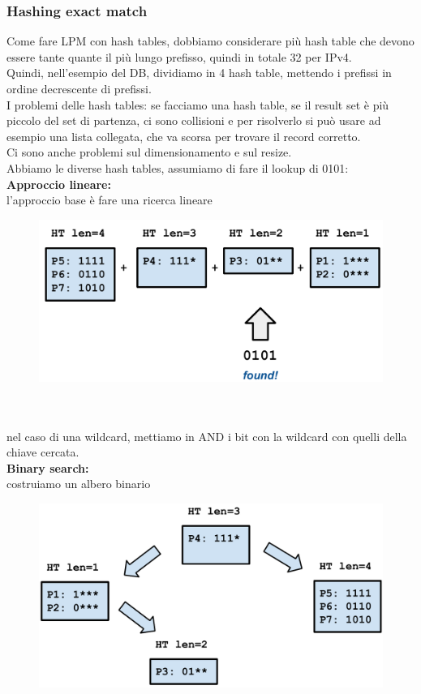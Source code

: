 \documentclass[12pt, oneside]{extbook} %
\begin{document}
\subsubsection{Hashing exact match}
Come fare LPM con hash tables, dobbiamo considerare più hash table che devono essere tante quante il più lungo prefisso, quindi in totale 32 per IPv4.
\\Quindi, nell'esempio del DB, dividiamo in 4 hash table, mettendo i prefissi in ordine decrescente di prefissi.
\\I problemi delle hash tables: se facciamo una hash table, se il result set è più piccolo del set di partenza, ci sono collisioni e per risolverlo si può usare ad esempio una lista collegata, che va scorsa per trovare il record corretto.
\\Ci sono anche problemi sul dimensionamento e sul resize.
\\Abbiamo le diverse hash tables, assumiamo di fare il lookup di 0101:\\ 
\textbf{Approccio lineare:}\\
l'approccio base è fare una ricerca lineare\\
\begin{figure}[h!]
    \centering
    \includegraphics[scale=0.5]{../../immagini/linear_search}
\end{figure}\\\\
nel caso di una wildcard, mettiamo in AND i bit con la wildcard con quelli della chiave cercata.\\
\textbf{Binary search:}\\
costruiamo un albero binario\\
\begin{figure}[h!]
    \centering
    \includegraphics[scale=0.5]{../../immagini/ht_search}
\end{figure}\\\\
\end{document}
